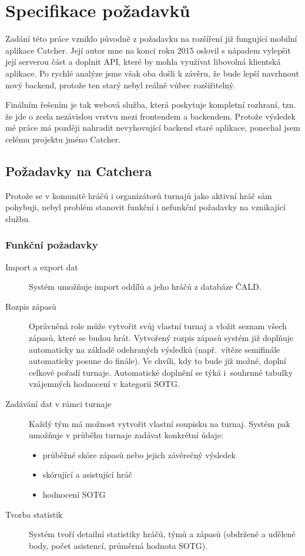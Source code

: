 \chapter{Specifikace požadavků}

Zadání této práce vzniklo původně z požadavku na rozšíření již fungující mobilní aplikace Catcher.
Její autor mne na konci roku 2015 oslovil s nápadem vylepšit její serverou část a doplnit API,
které by mohla využívat libovolná klientská aplikace. Po rychlé analýze jsme však oba došli k závěru,
že bude lepší navrhnout nový backend, protože ten starý nebyl reálně vůbec rozšiřitelný. %

Finálním řešením je tak webová služba, která poskytuje kompletní rozhraní,
tzn. že jde o zcela nezávislou vrstvu mezi frontendem a backendem.
Protože výsledek mé práce má později nahradit nevyhovující backend staré aplikace, ponechal jsem celému projektu jméno Catcher.

\section{Požadavky na Catchera}

Protože se v komunitě hráčů i organizátorů turnajů jako aktivní hráč sám pohybuji,
nebyl problém stanovit funkční i nefunkční požadavky na vznikající službu.

\subsection{Funkční požadavky}

\begin{description}
  \item[Import a export dat]
    Systém umožňuje import oddílů a jeho hráčů z databáze ČALD.
  \item[Rozpis zápasů]
    Oprávněná role může vytvořit svůj vlastní turnaj a vložit seznam všech zápasů,
    které se budou hrát. Vytvořený rozpis zápasů systém již doplňuje automaticky na základě
    odehraných výsledků (např.~vítěze semifinále automaticky posune do finále). Ve chvíli,
    kdy to bude již možné, doplní celkové pořadí turnaje. Automatické doplnění se
    týká i~souhrnné tabulky vzájemných hodnocení v kategorii SOTG.
  \item[Zadávání dat v rámci turnaje]
    Každý tým má možnost vytvořit vlastní soupisku na turnaj. Systém pak umožňuje
    v průběhu turnaje zadávat konkrétní údaje:
    \begin{itemize}
      \item průběžné skóre zápasů nebo jejich závěrečný výsledek
      \item skórující a asistující hráč
      \item hodnocení SOTG
    \end{itemize}
  \item[Tvorba statistik]
    Systém tvoří detailní statistiky hráčů, týmů a zápasů (obdržené a udělené body,
    počet asistencí, průměrná hodnota SOTG).
\end{description}

